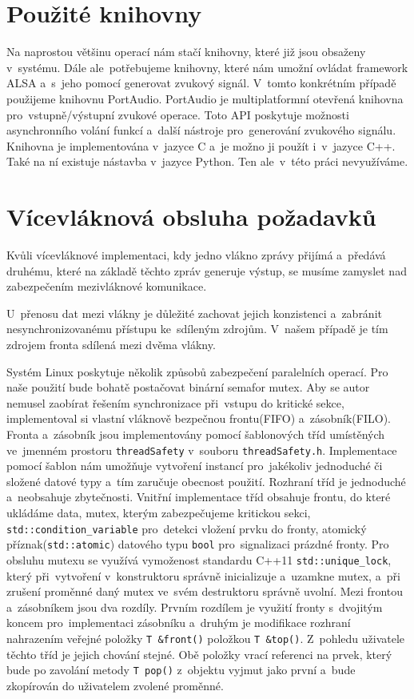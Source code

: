 	\section{Použité knihovny}
	Na naprostou většinu operací nám stačí knihovny, které již jsou obsaženy v~systému. Dále ale~potřebujeme knihovny, které nám umožní ovládat framework ALSA a~s~jeho pomocí generovat zvukový signál. V~tomto konkrétním případě použijeme knihovnu PortAudio. PortAudio je multiplatformní otevřená knihovna pro~vstupně/výstupní zvukové operace. Toto API poskytuje možnosti asynchronního volání funkcí a~další nástroje pro~generování zvukového signálu. Knihovna je implementována v~jazyce C a~je možno ji použít i~v~jazyce C++. Také na ní existuje nástavba v~jazyce Python. Ten ale~v~této práci nevyužíváme.
	
	
	\section{Vícevláknová obsluha požadavků}
	Kvůli vícevláknové implementaci, kdy jedno vlákno zprávy přijímá a~předává druhému, které na základě těchto zpráv generuje výstup, se musíme zamyslet nad zabezpečením mezivláknové komunikace.\par
	U~přenosu dat mezi vlákny je důležité zachovat jejich konzistenci a~zabránit nesynchronizovanému přístupu ke~sdíleným zdrojům. V~našem případě je tím zdrojem fronta sdílená mezi dvěma vlákny.\par
	Systém Linux poskytuje několik způsobů zabezpečení paralelních operací. Pro naše použití bude bohatě postačovat binární semafor mutex. Aby se autor nemusel zaobírat řešením synchronizace při~vstupu do kritické sekce, implementoval si vlastní vláknově bezpečnou frontu(FIFO) a~zásobník(FILO). Fronta a~zásobník jsou implementovány pomocí šablonových tříd umístěných ve~jmenném prostoru \texttt{threadSafety} v~souboru \texttt{threadSafety.h}. Implementace pomocí šablon nám umožňuje vytvoření instancí pro~jakékoliv jednoduché či složené datové typy a~tím zaručuje obecnost použití. Rozhraní tříd je jednoduché a~neobsahuje zbytečnosti. Vnitřní implementace tříd obsahuje frontu, do které ukládáme data, mutex, kterým zabezpečujeme kritickou sekci, \texttt{std::condition\_variable} pro~detekci vložení prvku do fronty, atomický příznak(\texttt{std::atomic}) datového typu \texttt{bool} pro~signalizaci prázdné fronty. Pro obsluhu mutexu se využívá vymoženost standardu C++11 \texttt{std::unique\_lock}, který při~vytvoření v~konstruktoru správně inicializuje a~uzamkne mutex, a~při zrušení proměnné daný mutex ve~svém destruktoru správně uvolní. Mezi frontou a~zásobníkem jsou dva rozdíly. Prvním rozdílem je využití fronty s~dvojitým koncem pro~implementaci zásobníku a~druhým je modifikace rozhraní nahrazením veřejné položky \texttt{T \&front()} položkou \texttt{T \&top()}. Z~pohledu uživatele těchto tříd je jejich chování stejné. Obě položky vrací referenci na prvek, který bude po zavolání metody \texttt{T pop()} z~objektu vyjmut jako první a~bude zkopírován do uživatelem zvolené proměnné.\par
